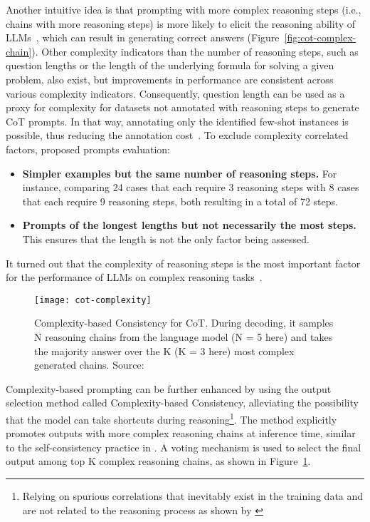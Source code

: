 Another intuitive idea is that prompting with more complex reasoning steps (i.e., chains with more reasoning steps) is more likely to elicit the reasoning ability of LLMs~\cite{fu2022complexity}, which can result in generating correct answers (Figure~\ref{fig:cot-complex-chain}).
Other complexity indicators than the number of reasoning steps, such as question lengths or the length of the underlying formula for solving a given problem, also exist, but improvements in performance are consistent across various complexity indicators.
Consequently, question length can be used as a proxy for complexity for datasets not annotated with reasoning steps to generate CoT prompts.
In that way, annotating only the identified few-shot instances is possible, thus reducing the annotation cost~\cite{fu2022complexity}.
To exclude complexity correlated factors, \textcite{fu2022complexity} proposed prompts evaluation:
\begin{itemize}
	\item \textbf{Simpler examples but the same number of reasoning steps.} {For instance, comparing 24 cases that each require 3 reasoning steps with 8 cases that each require 9 reasoning steps, both resulting in a total of 72 steps.}
	\item \textbf{Prompts of the longest lengths but not necessarily the most steps.} {This ensures that the length is not the only factor being assessed.}
\end{itemize}
It turned out that the complexity of reasoning steps is the most important factor for the performance of LLMs on complex reasoning tasks~\cite{fu2022complexity}.
\begin{figure}[h!]
	\centering
	\texttt{[image: cot-complexity]}
	\caption{Complexity-based Consistency for CoT. During decoding, it samples N reasoning chains from the language model (N = 5 here) and takes the majority answer over the K (K = 3 here) most complex generated chains. Source: \textcite{fu2022complexity}}
	\label{fig:complexity}
\end{figure}
Complexity-based prompting can be further enhanced by using the output selection method called Complexity-based Consistency, alleviating the possibility that the model can take shortcuts during reasoning\footnote{Relying on spurious correlations that inevitably exist in the training data and are not related to the reasoning process as shown by \textcite{mudrakarta2018model, li2021why, sugawara2018makes}}.
The method explicitly promotes outputs with more complex reasoning chains at inference time, similar to the self-consistency practice in \textcite{wang2022self}.
A voting mechanism is used to select the final output among top K complex reasoning chains, as shown in Figure~\ref{fig:complexity}.

